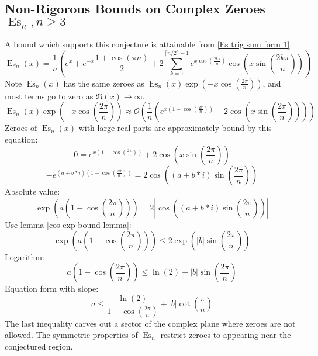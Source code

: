 \documentclass[]{article}
\DeclareMathOperator{\es}{Es}
\newcommand{\pqty}[1]{{\left(#1\right)}}
\newcommand{\abs}[1]{{\left\lvert#1\right\rvert}}
\numberwithin{equation}{section}
\begin{document}
	
	\subsection{Non-Rigorous Bounds on Complex Zeroes \(\es_n, n\geq 3\)}
	A bound which supports this conjecture is attainable from \eqref{Es trig sum form 1}.
	\begin{equation}
	\es_n\pqty{x}
	=
	\frac{1}{n}\pqty{
		e^x+e^{-x}\frac{1+\cos\pqty{\pi n}}{2} 
		+2\sum _{k=1}^{\lceil n/2\rceil-1}e^{x\cos\pqty{\frac{2k\pi}{n}}} \cos\pqty{x\sin\pqty{\frac{2k\pi}{n}}}
	}
	\end{equation}
	Note \(\es_n\pqty{x}\) has the same zeroes as \(\es_n\pqty{x}\exp\pqty{-x\cos\pqty{\frac{2\pi}{n}}}\), and most terms go to zero as \(\Re\pqty{x}\to\infty\).
	\begin{equation}
	\es_n\pqty{x}\exp\pqty{-x\cos\pqty{\frac{2\pi}{n}}}
	\approx\mathcal{O}\pqty{
	\frac{1}{n}\pqty{
		e^{x\pqty{1-\cos\pqty{\frac{2\pi}{n}}}}
		+2 \cos\pqty{x\sin\pqty{\frac{2\pi}{n}}}}
	}
	\end{equation}
	Zeroes of \(\es_n\pqty{x}\) with large real parts are approximately bound by this equation:
	\begin{equation}
		0=
		e^{x\pqty{1-\cos\pqty{\frac{2\pi}{n}}}}
		+2 \cos\pqty{x\sin\pqty{\frac{2\pi}{n}}}
	\end{equation}
	\begin{equation}
	-
	e^{\pqty{a+b*i}\pqty{1-\cos\pqty{\frac{2\pi}{n}}}}=
	2 \cos\pqty{\pqty{a+b*i}\sin\pqty{\frac{2\pi}{n}}}
	\end{equation}
	Absolute value:
	\begin{equation}
	\exp\pqty{a\pqty{1-\cos\pqty{\frac{2\pi}{n}}}}=
	2 \abs{\cos\pqty{\pqty{a+b*i}\sin\pqty{\frac{2\pi}{n}}}}
	\end{equation}
	Use lemma \eqref{cos exp bound lemma}:
	\begin{equation}
	\exp\pqty{a\pqty{1-\cos\pqty{\frac{2\pi}{n}}}}\leq
	2 \exp\pqty{\abs{b}\sin\pqty{\frac{2\pi}{n}}}
	\end{equation}
	Logarithm:
	\begin{equation}
	{a\pqty{1-\cos\pqty{\frac{2\pi}{n}}}}\leq
	\ln\pqty{2} + {\abs{b}\sin\pqty{\frac{2\pi}{n}}}
	\end{equation}
	Equation form with slope:
	\begin{equation}
	{a\leq
	\frac{\ln\pqty{2}}{{1-\cos\pqty{\frac{2\pi}{n}}}}} + {\abs{b}\cot\pqty{\frac{\pi}{n}}}
	\end{equation}
	The last inequality carves out a sector of the complex plane where zeroes are not allowed. The symmetric properties of \(\es_n\) restrict zeroes to appearing near the conjectured region.
	
\end{document}
